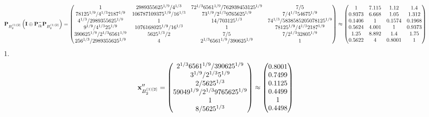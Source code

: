 \documentclass[10pt,a4paper]{article}
\begin{document}
	\[
		\bold{P}_{B_2^{(1)[2]}}\left(\bold{I} \oplus \bold{P}_{lk}^{-}\bold{P}_{B_2^{(1)[2]}}\right) = 
		\begin{pmatrix}
			{1}{} & {{2989355625^ {1 / 9}}} / {{4^ {1 / 3}}} & {{7}{2^ {1 / 3}}{6561^ {1 / 9}}} / {{762939453125^ {1 / 9}}} & {{7}} / {{5}} \\
			{{78125^ {1 / 9}}} / {{4^ {1 / 3}}{2187^ {1 / 9}}} & {{106787109375^ {1 / 9}}} / {{16^ {1 / 3}}} & {{7}{3^ {1 / 9}}} / {{2^ {1 / 3}}{9765625^ {1 / 9}}} & {{7}} / {{4^ {1 / 3}}{54675^ {1 / 9}}} \\
			{{4^ {1 / 3}}} / {{2989355625^ {1 / 9}}} & {1}{} & {{14}} / {{703125^ {1 / 3}}} & {{7}{4^ {1 / 3}}} / {{5838585205078125^ {1 / 9}}} \\
			{{9^ {1 / 9}}} / {{4^ {1 / 3}}{25^ {1 / 9}}} & {{1076168025^ {1 / 9}}} / {{16^ {1 / 3}}} & {1}{} & {{78125^ {1 / 9}}} / {{4^ {1 / 3}}{2187^ {1 / 9}}} \\
			{{390625^ {1 / 9}}} / {{2^ {1 / 3}}{6561^ {1 / 9}}} & {{5625^ {1 / 3}}} / {{2}} & {{7}} / {{5}} & {{7}} / {{2^ {1 / 3}}{32805^ {1 / 9}}} \\
			{{256^ {1 / 3}}} / {{2989355625^ {1 / 9}}} & {{4}}{} & {{2^ {1 / 3}}{6561^ {1 / 9}}} / {{390625^ {1 / 9}}} & {1}{} \\
		\end{pmatrix}
		\approx
		\begin{pmatrix}
			1        & 7.115    & 1.12     & 1.4      \\
			0.9373   & 6.668    & 1.05     & 1.312    \\
			0.1406   & 1        & 0.1574   & 0.1968   \\
			0.5624   & 4.001    & 1        & 0.9373   \\
			1.25     & 8.892    & 1.4      & 1.75     \\
			0.5622   & 4        & 0.8001   & 1        \\
		\end{pmatrix}
	\]
	1.
	\[
		\bold{x}''_{B_2^{(1)[2]}} = 
		\begin{pmatrix}
			{{2^ {1 / 3}}{6561^ {1 / 9}}} / {{390625^ {1 / 9}}} \\
			{{3^ {1 / 9}}} / {{2^ {1 / 3}}{5^ {1 / 9}}} \\
			{{2}} / {{5625^ {1 / 3}}} \\
			{{59049^ {1 / 9}}} / {{2^ {1 / 3}}{9765625^ {1 / 9}}} \\
			{1}{} \\
			{{8}} / {{5625^ {1 / 3}}} \\
		\end{pmatrix}
		\approx
		\begin{pmatrix}
			0.8001   \\
			0.7499   \\
			0.1125   \\
			0.4499   \\
			1        \\
			0.4498   \\
		\end{pmatrix}
	\]
\end{document}
